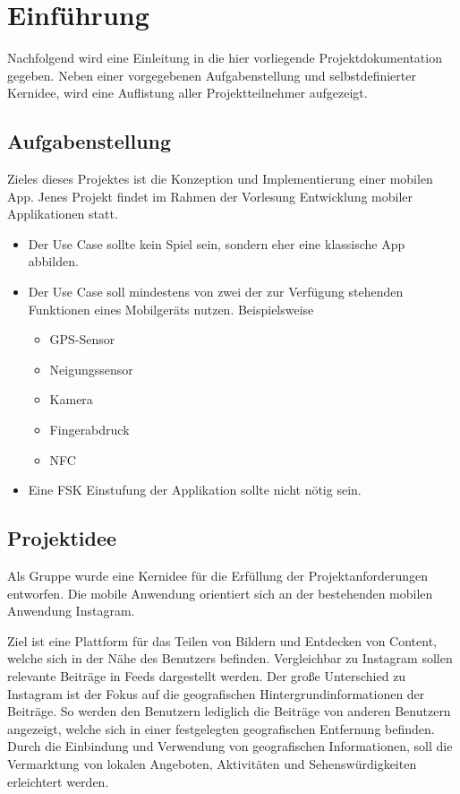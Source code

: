 \chapter{Einführung\label{chap1:Erstes-Kapitel}}

Nachfolgend wird eine Einleitung in die hier vorliegende Projektdokumentation gegeben. Neben einer vorgegebenen Aufgabenstellung und selbstdefinierter Kernidee, wird eine Auflistung aller Projektteilnehmer aufgezeigt.

\section{Aufgabenstellung\label{sec1.1:Unterpunkt-1}}

Zieles dieses Projektes ist die Konzeption und Implementierung einer mobilen App. Jenes Projekt findet im Rahmen der Vorlesung \glqq Entwicklung mobiler Applikationen\grqq{} statt.

\begin{itemize}
    \item Der Use Case sollte kein Spiel sein, sondern eher eine klassische App abbilden.
    \item Der Use Case soll mindestens von zwei der zur Verfügung stehenden Funktionen eines Mobilgeräts nutzen. Beispielsweise
    \begin{itemize}
        \item GPS-Sensor
        \item Neigungssensor
        \item Kamera
        \item Fingerabdruck
        \item NFC
    \end{itemize}
    \item Eine FSK Einstufung der Applikation sollte nicht nötig sein.
\end{itemize}

\section{Projektidee\label{sec1.2:Unterpunkt-2}}

Als Gruppe wurde eine Kernidee für die Erfüllung der Projektanforderungen entworfen. Die mobile Anwendung orientiert sich an der bestehenden mobilen Anwendung \glqq Instagram\grqq{}.

Ziel ist eine Plattform für das Teilen von Bildern und Entdecken von Content, welche sich in der Nähe des Benutzers befinden. Vergleichbar zu Instagram sollen relevante Beiträge in Feeds dargestellt werden. Der große Unterschied zu Instagram ist der Fokus auf die geografischen Hintergrundinformationen der Beiträge. So werden den Benutzern lediglich die Beiträge von anderen Benutzern angezeigt, welche sich in einer festgelegten geografischen Entfernung befinden. Durch die Einbindung und Verwendung von geografischen Informationen, soll die Vermarktung von lokalen Angeboten, Aktivitäten und Sehenswürdigkeiten erleichtert werden.

